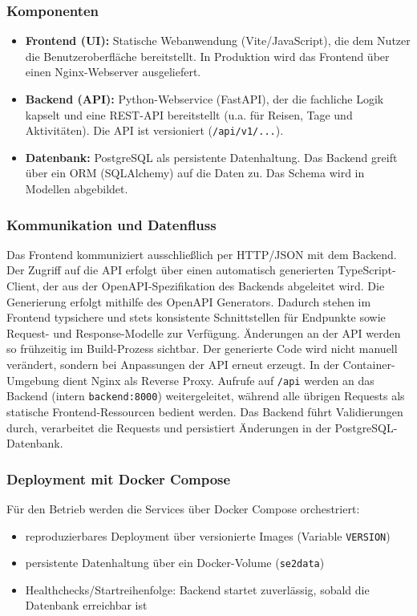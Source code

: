 \documentclass[12pt,a4paper]{article}
\begin{document}
\subsubsection{Komponenten}
\begin{itemize}[leftmargin=*]
    \item \textbf{Frontend (UI):} Statische Webanwendung (Vite/JavaScript), die dem Nutzer die Benutzeroberfläche bereitstellt.
          In Produktion wird das Frontend über einen Nginx-Webserver ausgeliefert.
    \item \textbf{Backend (API):} Python-Webservice (FastAPI), der die fachliche Logik kapselt und eine REST-API bereitstellt
          (u.a. für Reisen, Tage und Aktivitäten).
          Die API ist versioniert (\texttt{/api/v1/...}).
    \item \textbf{Datenbank:} PostgreSQL als persistente Datenhaltung.
          Das Backend greift über ein ORM (SQLAlchemy) auf die Daten zu. Das Schema wird in Modellen abgebildet.
\end{itemize}

\subsubsection{Kommunikation und Datenfluss}
Das Frontend kommuniziert ausschließlich per HTTP/JSON mit dem Backend.
Der Zugriff auf die API erfolgt über einen automatisch generierten TypeScript-Client, der aus der OpenAPI-Spezifikation des Backends abgeleitet wird.
Die Generierung erfolgt mithilfe des OpenAPI Generators.
Dadurch stehen im Frontend typsichere und stets konsistente Schnittstellen für Endpunkte sowie Request- und Response-Modelle zur Verfügung.
Änderungen an der API werden so frühzeitig im Build-Prozess sichtbar.
Der generierte Code wird nicht manuell verändert, sondern bei Anpassungen der API erneut erzeugt.
In der Container-Umgebung dient Nginx als Reverse Proxy.
Aufrufe auf \texttt{/api} werden an das Backend (intern \texttt{backend:8000}) weitergeleitet, während alle übrigen Requests
als statische Frontend-Ressourcen bedient werden. Das Backend führt Validierungen durch, verarbeitet die Requests
und persistiert Änderungen in der PostgreSQL-Datenbank.

\subsubsection{Deployment mit Docker Compose}
Für den Betrieb werden die Services über Docker Compose orchestriert:
\begin{itemize}[leftmargin=*]
    \item reproduzierbares Deployment über versionierte Images (Variable \texttt{VERSION})
    \item persistente Datenhaltung über ein Docker-Volume (\texttt{se2data})
    \item Healthchecks/Startreihenfolge: Backend startet zuverlässig, sobald die Datenbank erreichbar ist
\end{itemize}
\end{document}
